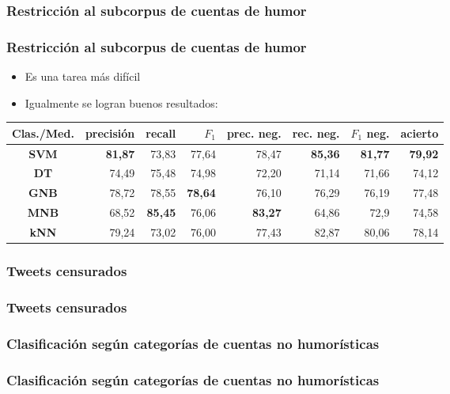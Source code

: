 \subsubsection{Restricción al subcorpus de cuentas de humor}
\begin{frame}
    \frametitle{Restricción al subcorpus de cuentas de humor}

    \begin{itemize}
        \item Es una tarea más difícil
        \item Igualmente se logran buenos resultados:
    \end{itemize}

    \begin{center}
        \scriptsize
        \begin{tabular}{ c | r | r | r | r | r | r | r }
            \textbf{Clas./Med.} & precisión & recall & $F_1$ & prec. neg. & rec. neg. & $F_1$ neg. & acierto \\
            \hline
            \textbf{SVM} & \textbf{81,87} & 73,83 & 77,64 & 78,47 & \textbf{85,36} & \textbf{81,77} & \textbf{79,92} \\
            \hline
            \textbf{DT} & 74,49 & 75,48 & 74,98 & 72,20 & 71,14 & 71,66 & 74,12 \\
            \hline
            \textbf{GNB} & 78,72 & 78,55 & \textbf{78,64} & 76,10 & 76,29 & 76,19 & 77,48 \\
            \hline
            \textbf{MNB} & 68,52 & \textbf{85,45} & 76,06 & \textbf{83,27} & 64,86 & 72,9 & 74,58 \\
            \hline
            \textbf{kNN} & 79,24 & 73,02 & 76,00 & 77,43 & 82,87 & 80,06 & 78,14 \\
        \end{tabular}
    \end{center}
\end{frame}

\subsubsection{Tweets censurados}
\begin{frame}
    \frametitle{Tweets censurados}

    
\end{frame}

\subsubsection{Clasificación según categorías de cuentas no humorísticas}
\begin{frame}
    \frametitle{Clasificación según categorías de cuentas no humorísticas}

    
\end{frame}

